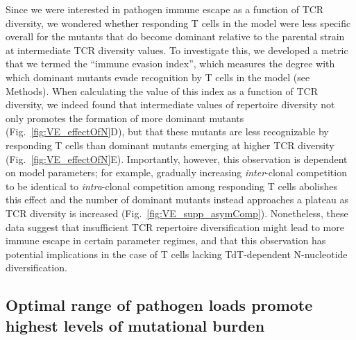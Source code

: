 Since we were interested in pathogen immune escape as a function of TCR diversity, we wondered whether responding T cells in the model were less specific overall for the mutants that do become dominant relative to the parental strain at intermediate TCR diversity values. To investigate this, we developed a metric that we termed the ``immune evasion index'', which measures the degree with which dominant mutants evade recognition by T cells in the model (see Methods). When calculating the value of this index as a function of TCR diversity, we indeed found that intermediate values of repertoire diversity not only promotes the formation of more dominant mutants (Fig.~\ref{fig:VE_effectOfN}D), but that these mutants are less recognizable by responding T cells than dominant mutants emerging at higher TCR diversity (Fig.~\ref{fig:VE_effectOfN}E). Importantly, however, this observation is dependent on model parameters; for example, gradually increasing \textit{inter}-clonal competition to be identical to \textit{intra}-clonal competition among responding T cells abolishes this effect and the number of dominant mutants instead approaches a plateau as TCR diversity is increased (Fig.~\ref{fig:VE_supp_asymComp}). Nonetheless, these data suggest that insufficient TCR repertoire diversification might lead to more immune escape in certain parameter regimes, and that this observation has potential implications in the case of T cells lacking TdT-dependent N-nucleotide diversification.


\subsection{Optimal range of pathogen loads promote highest levels of mutational burden}

